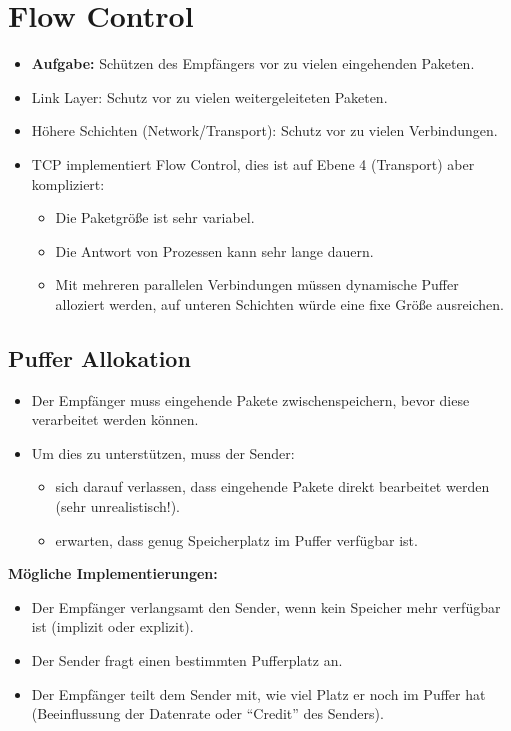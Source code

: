 	\section{Flow Control}
		\begin{itemize}
			\item \textbf{Aufgabe:} Schützen des Empfängers vor zu vielen eingehenden Paketen.
			\item Link Layer: Schutz vor zu vielen weitergeleiteten Paketen.
			\item Höhere Schichten (Network/Transport): Schutz vor zu vielen Verbindungen.
			\item TCP implementiert Flow Control, dies ist auf Ebene 4 (Transport) aber kompliziert:
				\begin{itemize}
					\item Die Paketgröße ist sehr variabel.
					\item Die Antwort von Prozessen kann sehr lange dauern.
					\item Mit mehreren parallelen Verbindungen müssen dynamische Puffer alloziert werden, auf unteren Schichten würde eine fixe Größe ausreichen.
				\end{itemize}
		\end{itemize}

		\subsection{Puffer Allokation}
			\begin{itemize}
				\item Der Empfänger muss eingehende Pakete zwischenspeichern, bevor diese verarbeitet werden können.
				\item Um dies zu unterstützen, muss der Sender:
					\begin{itemize}
						\item sich darauf verlassen, dass eingehende Pakete direkt bearbeitet werden (sehr unrealistisch!).
						\item erwarten, dass genug Speicherplatz im Puffer verfügbar ist.
					\end{itemize}
			\end{itemize}

			\textbf{Mögliche Implementierungen:}
			\begin{itemize}
				\item Der Empfänger verlangsamt den Sender, wenn kein Speicher mehr verfügbar ist (implizit oder explizit).
				\item Der Sender fragt einen bestimmten Pufferplatz an.
				\item Der Empfänger teilt dem Sender mit, wie viel Platz er noch im Puffer hat (Beeinflussung der Datenrate oder \enquote{Credit} des Senders).
			\end{itemize}

